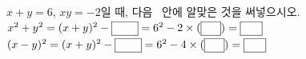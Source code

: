 $x+y=6$, $xy=-2$일 때, 다음 \blank\ 안에 알맞은 것을 써넣으시오.
 $x^2+y^2=(x+y)^2-\blank[2.4em]=6^2-2\times(\blank[1.8em])=\blank[2em]$
 $(x-y)^2=(x+y)^2-\blank[2.4em]=6^2-4\times(\blank[1.8em])=\blank[2em]$
